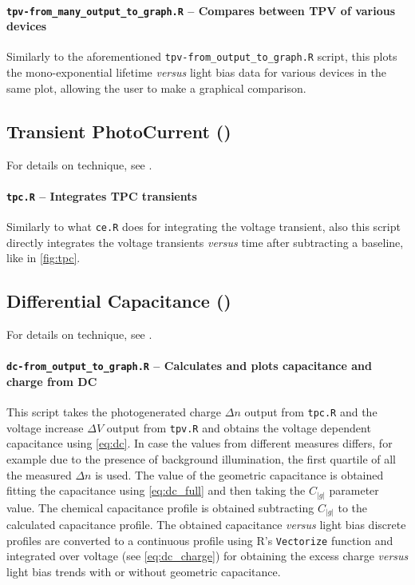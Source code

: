		\paragraph{\texttt{tpv-\-from\_many\_output\_to\_graph.R} -- Compares between TPV of various devices}
		Similarly to the aforementioned \texttt{tpv-\-from\_output\_to\_graph.R} script, this plots the mono\hyp{}exponential lifetime \textsl{versus} light bias data for various devices in the same plot, allowing the user to make a graphical comparison.
%
	\subsection{Transient PhotoCurrent ()}\label{r_tpc}
	For details on  technique, see .

		\paragraph{\texttt{tpc.R} -- Integrates TPC transients}
		Similarly to what \texttt{ce.R} does for integrating the  voltage transient, also this script directly integrates the voltage transients \textsl{versus} time after subtracting a baseline, like in \cref{fig:tpc}.
		
%
%
	\subsection{Differential Capacitance ()}\label{r_dc}
	For details on  technique, see .

		\paragraph{\texttt{dc-\-from\_output\_to\_graph.R} -- Calculates and plots capacitance and charge from DC}
		This script takes the photogenerated charge $\Delta n$ output from \texttt{tpc.R} and the voltage increase $\Delta V$ output from \texttt{tpv.R} and obtains the voltage dependent capacitance using \cref{eq:dc}.
		In case the values from different  measures differs, for example due to the presence of background illumination, the first quartile of all the measured $\Delta n$ is used.
		The value of the geometric capacitance is obtained fitting the capacitance using \cref{eq:dc_full} and then taking the $C_|g|$ parameter value.
		The chemical capacitance profile is obtained subtracting $C_|g|$ to the calculated capacitance profile.
		The obtained capacitance \textsl{versus} light bias discrete profiles are converted to a continuous profile using R's \texttt{Vectorize} function and integrated over voltage (see \cref{eq:dc_charge}) for obtaining the excess charge \textsl{versus} light bias trends with or without geometric capacitance.

